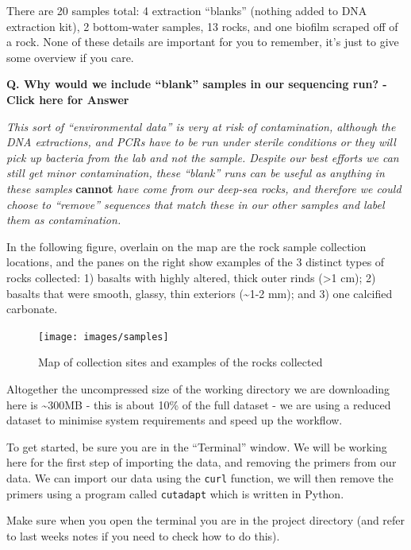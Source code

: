 \documentclass[
]{book}
\begin{document}
There are 20 samples total: 4 extraction ``blanks'' (nothing added to DNA extraction kit), 2 bottom-water samples, 13 rocks, and one biofilm scraped off of a rock. None of these details are important for you to remember, it's just to give some overview if you care.

\textbf{Q. Why would we include ``blank'' samples in our sequencing run? - Click here for Answer}

\emph{This sort of ``environmental data'' is very at risk of contamination, although the DNA extractions, and PCRs have to be run under sterile conditions or they will pick up bacteria from the lab and not the sample. Despite our best efforts we can still get minor contamination, these ``blank'' runs can be useful as anything in these samples} \textbf{cannot} \emph{have come from our deep-sea rocks, and therefore we could choose to ``remove'' sequences that match these in our other samples and label them as contamination.}

In the following figure, overlain on the map are the rock sample collection locations, and the panes on the right show examples of the 3 distinct types of rocks collected: 1) basalts with highly altered, thick outer rinds (\textgreater1 cm); 2) basalts that were smooth, glassy, thin exteriors (\textasciitilde1-2 mm); and 3) one calcified carbonate.

\begin{figure}

{\centering \texttt{[image: images/samples]} 

}

\caption{Map of collection sites and examples of the rocks collected}\label{fig:nice-fig}
\end{figure}

Altogether the uncompressed size of the working directory we are downloading here is \textasciitilde300MB - this is about 10\% of the full dataset - we are using a reduced dataset to minimise system requirements and speed up the workflow.

To get started, be sure you are in the ``Terminal'' window. We will be working here for the first step of importing the data, and removing the primers from our data. We can import our data using the \texttt{curl} function, we will then remove the primers using a program called \texttt{cutadapt} which is written in Python.

Make sure when you open the terminal you are in the project directory (and refer to last weeks notes if you need to check how to do this).
\end{document}
